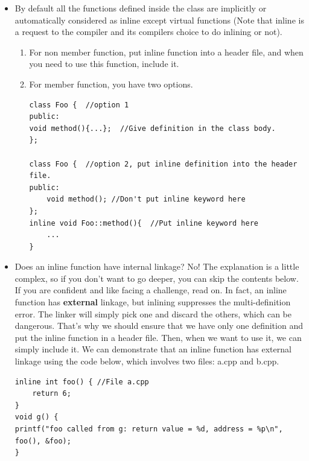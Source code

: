 \documentclass[a4paper,11pt,twoside]{book}
\begin{document}
\begin{itemize}
	\item By default all the functions defined inside the class are implicitly or automatically considered as inline except virtual functions (Note that inline is a request to the compiler and its compilers choice to do inlining or not).
	
	\begin{enumerate}
		\item For non member function, put inline function into a header file, and when you need to use this function, include it.
		
		\item For member function, you have two options.
\begin{lstlisting}[numbers=none]
class Foo {  //option 1
public:
void method(){...};  //Give definition in the class body.
};

class Foo {  //option 2, put inline definition into the header file.
public:
	void method(); //Don't put inline keyword here
};
inline void Foo::method(){  //Put inline keyword here
	...
}
\end{lstlisting}
	\end{enumerate}
		
	
	\item Does an inline function have internal linkage? No! The explanation is a little complex, so if you don't want to go deeper, you can skip the contents below. If you are confident and like facing a challenge, read on. In fact, an inline function has \textbf{external} linkage, but inlining suppresses the multi-definition error. The linker will simply pick one and discard the others, which can be dangerous. That's why we should ensure that we have only one definition and put the inline function in a header file. Then, when we want to use it, we can simply include it. We can demonstrate that an inline function has external linkage using the code below, which involves two files: a.cpp and b.cpp.
\begin{lstlisting}
inline int foo() { //File a.cpp
	return 6;
}
void g() {
printf("foo called from g: return value = %d, address = %p\n", foo(), &foo);
}


\end{lstlisting}
\end{itemize}
\end{document}
